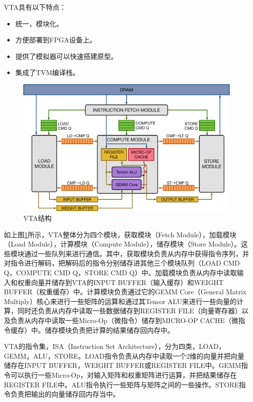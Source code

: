 VTA具有以下特点：
\begin{itemize}
    \item {统一，模块化。}
    \item {方便部署到FPGA设备上。}
    \item {提供了模拟器可以快速搭建原型。}
    \item {集成了TVM编译栈。}
\end{itemize}

\begin{figure}[h!]
    \centering
    \includegraphics[width=270bp]{figure/vta_overview.png}
    \caption{VTA结构}
    \label{vta}
\end{figure}

如上图\ref{vta}所示，VTA整体分为四个模块，获取模块（Fetch Module），加载模块（Load Module），计算模块（Compute Module），储存模块（Store Module）。这些模块通过一些队列来进行通信。其中，获取模块负责从内存中获得指令序列，并对指令进行解码，把解码后的指令分别储存进其他三个模块队列（LOAD CMD Q，COMPUTE CMD Q，STORE CMD Q）中。加载模块负责从内存中读取输入和权重向量并储存到VTA的INPUT BUFFER（输入缓存）和WEIGHT BUFFER（权重缓存）中。计算模块负责通过它的GEMM Core（General Matrix Multiply）核心来进行一些矩阵的运算和通过其Tensor ALU来进行一些向量的计算，同时还负责从内存中读取一些数据储存到REGISTER FILE（向量寄存器）以及负责从内存中读取一些Micro-Op（微指令）储存到MICRO-OP CACHE（微指令缓存）中。储存模块负责把计算的结果储存回内存中。

VTA的指令集，ISA（Instruction Set Architecture），分为四类，LOAD，GEMM，ALU，STORE。LOAD指令负责从内存中读取一个2维的向量并把向量储存在INPUT BUFFER，WEIGHT BUFFER或REGISTER FILE中。GEMM指令可以执行一些Micro-Op，对输入矩阵和权重矩阵进行运算，并把结果储存在REGISTER FILE中。ALU指令执行一些矩阵与矩阵之间的一些操作。STORE指令负责把输出的向量储存回内存当中。